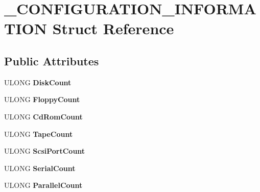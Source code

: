 \hypertarget{struct__CONFIGURATION__INFORMATION}{}\section{\+\_\+\+C\+O\+N\+F\+I\+G\+U\+R\+A\+T\+I\+O\+N\+\_\+\+I\+N\+F\+O\+R\+M\+A\+T\+I\+O\+N Struct Reference}
\label{struct__CONFIGURATION__INFORMATION}
\subsection*{Public Attributes}
\begin{DoxyCompactItemize}
\item 
\hypertarget{struct__CONFIGURATION__INFORMATION_afe3896a85ed932a0c4114c67dbba86f7}{}U\+L\+O\+N\+G {\bfseries Disk\+Count}\label{struct__CONFIGURATION__INFORMATION_afe3896a85ed932a0c4114c67dbba86f7}

\item 
\hypertarget{struct__CONFIGURATION__INFORMATION_acfccfbec7d81570e65fb90c4c2578581}{}U\+L\+O\+N\+G {\bfseries Floppy\+Count}\label{struct__CONFIGURATION__INFORMATION_acfccfbec7d81570e65fb90c4c2578581}

\item 
\hypertarget{struct__CONFIGURATION__INFORMATION_ad195d6872ffc89f8c44fd7999fdbf090}{}U\+L\+O\+N\+G {\bfseries Cd\+Rom\+Count}\label{struct__CONFIGURATION__INFORMATION_ad195d6872ffc89f8c44fd7999fdbf090}

\item 
\hypertarget{struct__CONFIGURATION__INFORMATION_ab64a6e4f03224da1c5b02fad4743dbd8}{}U\+L\+O\+N\+G {\bfseries Tape\+Count}\label{struct__CONFIGURATION__INFORMATION_ab64a6e4f03224da1c5b02fad4743dbd8}

\item 
\hypertarget{struct__CONFIGURATION__INFORMATION_adc5df7e242c41ccf2ffe28e1e2b9eef1}{}U\+L\+O\+N\+G {\bfseries Scsi\+Port\+Count}\label{struct__CONFIGURATION__INFORMATION_adc5df7e242c41ccf2ffe28e1e2b9eef1}

\item 
\hypertarget{struct__CONFIGURATION__INFORMATION_a6961891a28a775859dc636f26bfab58b}{}U\+L\+O\+N\+G {\bfseries Serial\+Count}\label{struct__CONFIGURATION__INFORMATION_a6961891a28a775859dc636f26bfab58b}

\item 
\hypertarget{struct__CONFIGURATION__INFORMATION_aaff1ac2cf87589e2fec67b8e71e29181}{}U\+L\+O\+N\+G {\bfseries Parallel\+Count}\label{struct__CONFIGURATION__INFORMATION_aaff1ac2cf87589e2fec67b8e71e29181}


\end{DoxyCompactItemize}
